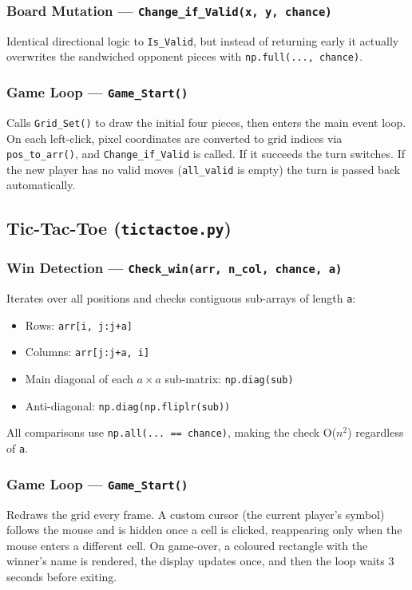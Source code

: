 \documentclass[12pt]{article}
\begin{document}
\subsubsection{Board Mutation --- \texttt{Change\_if\_Valid(x, y, chance)}}
Identical directional logic to \texttt{Is\_Valid}, but instead of returning early it actually overwrites the sandwiched opponent pieces with \texttt{np.full(..., chance)}.

\subsubsection{Game Loop --- \texttt{Game\_Start()}}
Calls \texttt{Grid\_Set()} to draw the initial four pieces, then enters the main event loop. On each left-click, pixel coordinates are converted to grid indices via \texttt{pos\_to\_arr()}, and \texttt{Change\_if\_Valid} is called. If it succeeds the turn switches. If the new player has no valid moves (\texttt{all\_valid} is empty) the turn is passed back automatically.

\subsection{Tic-Tac-Toe (\texttt{tictactoe.py})}

\subsubsection{Win Detection --- \texttt{Check\_win(arr, n\_col, chance, a)}}
Iterates over all positions and checks contiguous sub-arrays of length \texttt{a}:
\begin{itemize}
    \item Rows: \texttt{arr[i, j:j+a]}
    \item Columns: \texttt{arr[j:j+a, i]}
    \item Main diagonal of each $a \times a$ sub-matrix: \texttt{np.diag(sub)}
    \item Anti-diagonal: \texttt{np.diag(np.fliplr(sub))}
\end{itemize}
All comparisons use \texttt{np.all(...~== chance)}, making the check O($n^2$) regardless of \texttt{a}.

\subsubsection{Game Loop --- \texttt{Game\_Start()}}
Redraws the grid every frame. A custom cursor (the current player's symbol) follows the mouse and is hidden once a cell is clicked, reappearing only when the mouse enters a different cell. On game-over, a coloured rectangle with the winner's name is rendered, the display updates once, and then the loop waits 3 seconds before exiting.
\end{document}
